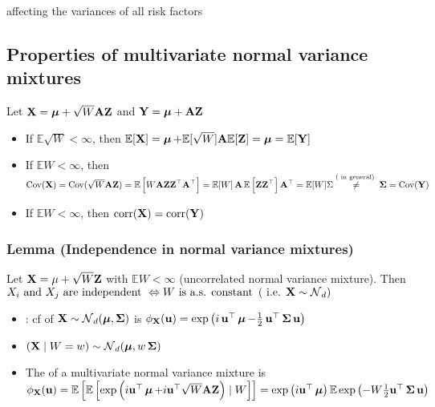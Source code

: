  affecting the variances of all risk factors







\subsection*{Properties of multivariate normal variance mixtures}
Let $\vect{X}=\vect{\mu}+\sqrt{W} \vect{A Z}$ and $\vect{Y}=\vect{\mu}+\vect{A Z}$
\begin{itemize}[leftmargin=*]
    \item If $\mathbb{E} \sqrt{W}<\infty$, then $\mathbb{E}[\vect{X}]=\mmu+\mathbb{E}[\sqrt{W}] \vect{A} \mathbb{E}[\vect{Z}]=\mmu=\mathbb{E}[\vect{Y}]$
    \item If $\mathbb{E} W<\infty$, then
$
\operatorname{Cov}(\vect{X})=\operatorname{Cov}(\sqrt{W} \vect{AZ})=\mathbb{E}\left[W \vect{AZZ}^{\T} \vect{A}^{\T}\right]=\mathbb{E}[W] \A \mathbb{E}\left[\vect{ZZ}^{\T}\right] \vect{A}^{\T}=\mathbb{E}[W] \Sigma \stackrel{(\text { in general) }}{\neq} \mSigma=\operatorname{Cov}(\vect{Y})
$
    \item If $\mathbb{E} W<\infty$, then $\operatorname{corr}(\vect{X})=\operatorname{corr}(\vect{Y})$
\end{itemize}

\subsubsection*{Lemma (Independence in normal variance mixtures)}
Let $\vect{X}=\mu+\sqrt{W} \vect{Z}$ with $\mathbb{E} W<\infty$ (uncorrelated normal variance mixture).
Then
$
X_{i} \text { and } X_{j} \text { are independent } \Leftrightarrow W \text { is a.s. constant }\left(\text { i.e. } \vect{X} \sim \N_{d}\right)
$




\begin{itemize}[leftmargin=*]
    \item {}: cf of $\X \sim \N_{d}(\mmu, \mSigma)$ is $\phi_{\X}(\u)=\exp \left(i \u^{\T} \mmu-\frac{1}{2} \u^{\T} \mSigma \u\right)$
    \item $(\X \mid W=w) \sim \N_{d}(\mmu, w \mSigma)$

    \item The  of a multivariate normal variance mixture is
$
\phi_{\vect{X}}(\vect{u})=\mathbb{E}\left[\mathbb{E}\left[\exp \left(i \vect{u}^{\T} \mmu+i \vect{u}^{\T} \sqrt{W} \vect{AZ}\right) \mid W\right]\right]=\exp \left(i \vect{u}^{\T} \mmu\right) \mathbb{E} \exp \left(-W \frac{1}{2} \vect{u}^{\T} \mSigma \vect{u}\right)
$
\end{itemize}





